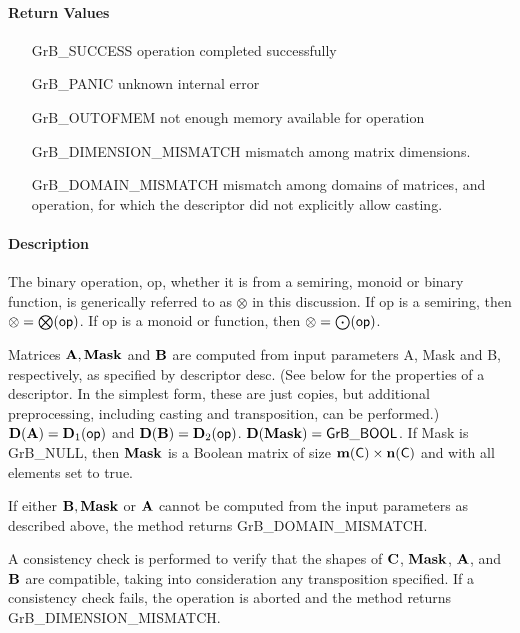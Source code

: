 \paragraph{Return Values}

\begin{itemize}[leftmargin=2.1in]
    \item[{\sf GrB\_SUCCESS}]             operation completed successfully
    \item[{\sf GrB\_PANIC}]               unknown internal error
    \item[{\sf GrB\_OUTOFMEM}]            not enough memory available for operation
    \item[{\sf GrB\_DIMENSION\_MISMATCH}] mismatch among matrix dimensions.
    \item[{\sf GrB\_DOMAIN\_MISMATCH}]    mismatch among domains of matrices, and operation, for which the descriptor did not explicitly allow casting.
\end{itemize}

\paragraph{Description}

The binary operation, {\sf op}, whether it is from a semiring, monoid or binary function,
is generically referred to as $\otimes$ in this discussion.
If {\sf op} is a semiring, then $\otimes = \bigotimes({\sf op})$. 
If {\sf op} is a monoid or function, then $\otimes = \bigodot({\sf op})$.

Matrices ${\bf A}, {\bf Mask}$ and ${\bf B}$ are computed from
input parameters {\sf A}, {\sf Mask} and {\sf B}, respectively, as specified
by descriptor {\sf desc}. (See below for the properties of a descriptor. In
the simplest form, these are just copies, but additional preprocessing,
including casting and transposition, can be performed.)  $\bold{D}({\bf A}) =
\bold{D}_1({\sf op})$ and $\bold{D}({\bf B}) = \bold{D}_2({\sf op})$.
$\bold{D}({\bf Mask}) = {\sf GrB\_BOOL}$.  If {\sf Mask} is {\sf GrB\_NULL},
then ${\bf Mask}$ is a Boolean matrix of size $\bold{m}({\bf \sf C}) \times \bold{n}({\bf \sf C})$
and with all elements set to {\sf true}.

If either ${\bf B}, {\bf Mask}$ or ${\bf A}$ cannot be computed
from the input parameters as described above, the method returns {\sf
    GrB\_DOMAIN\_MISMATCH}.

A consistency check is performed to verify that the 
shapes of ${\bf C}$, ${\bf Mask}$, ${\bf A}$, and ${\bf B}$
are compatible, taking into consideration any transposition specified.
If a consistency
check fails, the operation is aborted and the method returns {\sf
    GrB\_DIMENSION\_MISMATCH}.

